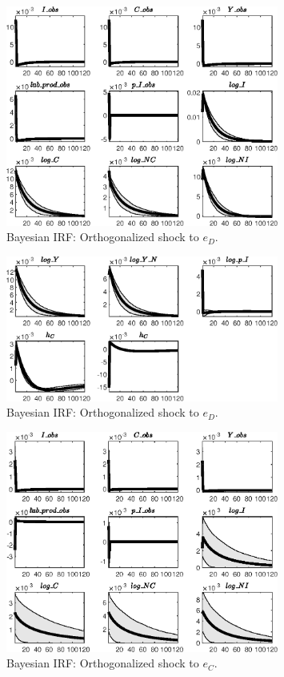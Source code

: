 \begin{figure}[H]
\centering 
\includegraphics[width=0.80\textwidth]{BRS_growth_ext_comovement/Output/BRS_growth_ext_comovement_Bayesian_IRF_e_D_1}
\caption{Bayesian IRF: Orthogonalized shock to ${e_D}$.}
\label{Fig:BayesianIRF:e_D:1}
\end{figure}
 
\begin{figure}[H]
\centering 
\includegraphics[width=0.80\textwidth]{BRS_growth_ext_comovement/Output/BRS_growth_ext_comovement_Bayesian_IRF_e_D_2}
\caption{Bayesian IRF: Orthogonalized shock to ${e_D}$.}
\label{Fig:BayesianIRF:e_D:2}
\end{figure}
 
\begin{figure}[H]
\centering 
\includegraphics[width=0.80\textwidth]{BRS_growth_ext_comovement/Output/BRS_growth_ext_comovement_Bayesian_IRF_e_C_1}
\caption{Bayesian IRF: Orthogonalized shock to ${e_C}$.}
\label{Fig:BayesianIRF:e_C:1}
\end{figure}
 
